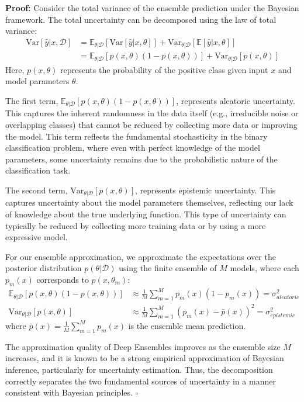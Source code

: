 \documentclass[journal]{IEEEtran}
\newenvironment{proof}{\par\medskip\noindent \textbf{Proof:} \rmfamily}{\hfill$\square$\medskip}
\begin{document}
\begin{proof}
Consider the total variance of the ensemble prediction under the Bayesian framework. The total uncertainty can be decomposed using the law of total variance:
\begin{align}
\text{Var}[\hat{y}|x, \mathcal{D}] &= \mathbb{E}_{\theta|\mathcal{D}}[\text{Var}[\hat{y}|x,\theta]] + \text{Var}_{\theta|\mathcal{D}}[\mathbb{E}[\hat{y}|x,\theta]] \\
&= \mathbb{E}_{\theta|\mathcal{D}}[p(x,\theta)(1-p(x,\theta))] + \text{Var}_{\theta|\mathcal{D}}[p(x,\theta)]
\end{align}
Here, $p(x,\theta)$ represents the probability of the positive class given input $x$ and model parameters $\theta$.

The first term, $\mathbb{E}_{\theta|\mathcal{D}}[p(x,\theta)(1-p(x,\theta))]$, represents aleatoric uncertainty. This captures the inherent randomness in the data itself (e.g., irreducible noise or overlapping classes) that cannot be reduced by collecting more data or improving the model. This term reflects the fundamental stochasticity in the binary classification problem, where even with perfect knowledge of the model parameters, some uncertainty remains due to the probabilistic nature of the classification task.

The second term, $\text{Var}_{\theta|\mathcal{D}}[p(x,\theta)]$, represents epistemic uncertainty. This captures uncertainty about the model parameters themselves, reflecting our lack of knowledge about the true underlying function. This type of uncertainty can typically be reduced by collecting more training data or by using a more expressive model.

For our ensemble approximation, we approximate the expectations over the posterior distribution $p(\theta|\mathcal{D})$ using the finite ensemble of $M$ models, where each $p_m(x)$ corresponds to $p(x, \theta_m)$:
\begin{align}
\mathbb{E}_{\theta|\mathcal{D}}[p(x,\theta)(1-p(x,\theta))] &\approx \frac{1}{M} \sum_{m=1}^M p_m(x)(1-p_m(x)) = \sigma_{aleatoric}^2 \\
\text{Var}_{\theta|\mathcal{D}}[p(x,\theta)] &\approx \frac{1}{M} \sum_{m=1}^M (p_m(x) - \bar{p}(x))^2 = \sigma_{epistemic}^2
\end{align}
where $\bar{p}(x) = \frac{1}{M} \sum_{m=1}^M p_m(x)$ is the ensemble mean prediction.

The approximation quality of Deep Ensembles improves as the ensemble size $M$ increases, and it is known to be a strong empirical approximation of Bayesian inference, particularly for uncertainty estimation. Thus, the decomposition correctly separates the two fundamental sources of uncertainty in a manner consistent with Bayesian principles.
\end{proof}
\end{document}
